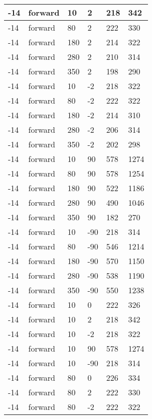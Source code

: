 \begin{table}
\begin{center}
\begin{tabular}{|l|l|l|l|l|l|}
			\hline
			-14 & forward & 10 & 2 & 218 & 342 \\
			\hline
			-14 & forward & 80 & 2 & 222 & 330 \\
			\hline
			-14 & forward & 180 & 2 & 214 & 322 \\
			\hline
			-14 & forward & 280 & 2 & 210 & 314 \\
			\hline
			-14 & forward & 350 & 2 & 198 & 290 \\
			\hline
			-14 & forward & 10 & -2 & 218 & 322 \\
			\hline
			-14 & forward & 80 & -2 & 222 & 322 \\
			\hline
			-14 & forward & 180 & -2 & 214 & 310 \\
			\hline
			-14 & forward & 280 & -2 & 206 & 314 \\
			\hline
			-14 & forward & 350 & -2 & 202 & 298 \\
			\hline
			-14 & forward & 10 & 90 & 578 & 1274 \\
			\hline
			-14 & forward & 80 & 90 & 578 & 1254 \\
			\hline
			-14 & forward & 180 & 90 & 522 & 1186 \\
			\hline
			-14 & forward & 280 & 90 & 490 & 1046 \\
			\hline
			-14 & forward & 350 & 90 & 182 & 270 \\
			\hline
			-14 & forward & 10 & -90 & 218 & 314 \\
			\hline
			-14 & forward & 80 & -90 & 546 & 1214 \\
			\hline
			-14 & forward & 180 & -90 & 570 & 1150 \\
			\hline
			-14 & forward & 280 & -90 & 538 & 1190 \\
			\hline
			-14 & forward & 350 & -90 & 550 & 1238 \\
			\hline
			-14 & forward & 10 & 0 & 222 & 326 \\
			\hline
			-14 & forward & 10 & 2 & 218 & 342 \\
			\hline
			-14 & forward & 10 & -2 & 218 & 322 \\
			\hline
			-14 & forward & 10 & 90 & 578 & 1274 \\
			\hline
			-14 & forward & 10 & -90 & 218 & 314 \\
			\hline
			-14 & forward & 80 & 0 & 226 & 334 \\
			\hline
			-14 & forward & 80 & 2 & 222 & 330 \\
			\hline
			-14 & forward & 80 & -2 & 222 & 322 \\
			\hline

\end{tabular}
\end{center}
\end{table}
